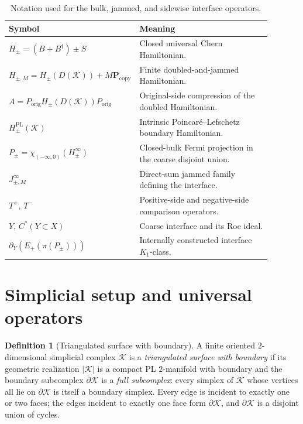 \documentclass[11pt]{article}
\numberwithin{equation}{section}
\theoremstyle{definition}
\newtheorem{definition}[theorem]{Definition}
\theoremstyle{remark}
\newcommand{\K}{\mathcal{K}}
\newcommand{\bd}{\partial}
\newcommand{\Proj}{\mathbf{P}}
\begin{document}
\begin{table}[H]
\centering
\small
\caption{Notation used for the bulk, jammed, and sidewise interface operators.}
\label{tab:notation_ledger}
\begin{tabular}{>{\raggedright\arraybackslash}p{0.24\linewidth}
                >{\raggedright\arraybackslash}p{0.65\linewidth}}
\toprule
Symbol & Meaning \\
\midrule
\(H_\pm=(B+B^\dagger)\pm S\) & Closed universal Chern Hamiltonian. \\
\(H_{\pm,M}=H_\pm(D(\K))+M\Proj_{\mathrm{copy}}\) & Finite doubled-and-jammed Hamiltonian. \\
\(A=P_{\mathrm{orig}}H_\pm(D(\K))P_{\mathrm{orig}}\) & Original-side compression of the doubled
Hamiltonian. \\
\(H_\pm^{\mathrm{PL}}(\K)\) & Intrinsic Poincar\'e--Lefschetz boundary Hamiltonian. \\
\(P_\pm=\chi_{(-\infty,0)}(H_\pm^\infty)\) & Closed-bulk Fermi projection in the coarse disjoint
union. \\
\(J_{\pm,M}^\infty\) & Direct-sum jammed family defining the interface. \\
\(T^+\), \(T^-\) & Positive-side and negative-side comparison operators. \\
\(Y\), \(C^*(Y\subset X)\) & Coarse interface and its Roe ideal. \\
\(\partial_Y(E_+(\pi(P_\pm)))\) & Internally constructed interface \(K_1\)-class. \\
\bottomrule
\end{tabular}
\end{table}

\section{Simplicial setup and universal operators}\label{sec:setup}

\begin{definition}[Triangulated surface with boundary]\label{def:surfwithbdry}
A finite oriented $2$-dimensional simplicial complex $\K$ is a \emph{triangulated surface with
boundary} if its geometric realization $|\K|$ is a compact PL $2$-manifold with boundary and the
boundary subcomplex $\bd\K$ is a \emph{full subcomplex}: every simplex of $\K$ whose vertices all
lie on $\bd\K$ is itself a boundary simplex. Every edge is incident to exactly one or two faces;
the edges incident to exactly one face form $\bd\K$, and $\bd\K$ is a disjoint union of cycles.
\end{definition}
\end{document}

